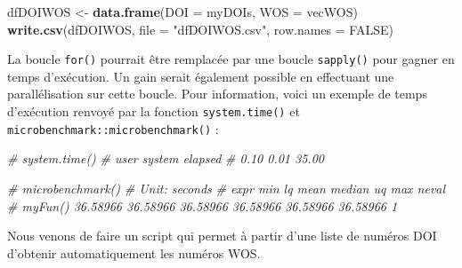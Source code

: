 \documentclass[
]{book}
\newenvironment{Shaded}{\begin{snugshade}}{\end{snugshade}}
\newcommand{\CommentTok}[1]{\textcolor[rgb]{0.56,0.35,0.01}{\textit{#1}}}
\newcommand{\DataTypeTok}[1]{\textcolor[rgb]{0.13,0.29,0.53}{#1}}
\newcommand{\KeywordTok}[1]{\textcolor[rgb]{0.13,0.29,0.53}{\textbf{#1}}}
\newcommand{\NormalTok}[1]{#1}
\newcommand{\OtherTok}[1]{\textcolor[rgb]{0.56,0.35,0.01}{#1}}
\newcommand{\StringTok}[1]{\textcolor[rgb]{0.31,0.60,0.02}{#1}}
\begin{document}
\begin{Shaded}
\begin{Highlighting}[]
\NormalTok{dfDOIWOS <-}\StringTok{ }\KeywordTok{data.frame}\NormalTok{(}\DataTypeTok{DOI =}\NormalTok{ myDOIs, }\DataTypeTok{WOS =}\NormalTok{ vecWOS)}
\KeywordTok{write.csv}\NormalTok{(dfDOIWOS, }\DataTypeTok{file =} \StringTok{"dfDOIWOS.csv"}\NormalTok{, }\DataTypeTok{row.names =} \OtherTok{FALSE}\NormalTok{)}
\end{Highlighting}
\end{Shaded}

La boucle \texttt{for()} pourrait être remplacée par une boucle \texttt{sapply()} pour gagner en temps d'exécution. Un gain serait également possible en effectuant une parallélisation sur cette boucle. Pour information, voici un exemple de temps d'exécution renvoyé par la fonction \texttt{system.time()} et \texttt{microbenchmark::microbenchmark()} :

\begin{Shaded}
\begin{Highlighting}[]
\CommentTok{# system.time()}
\CommentTok{#   user  system elapsed}
\CommentTok{#   0.10    0.01   35.00}

\CommentTok{# microbenchmark()}
\CommentTok{# Unit: seconds}
\CommentTok{#     expr      min       lq     mean   median       uq      max neval}
\CommentTok{#  myFun() 36.58966 36.58966 36.58966 36.58966 36.58966 36.58966     1}
\end{Highlighting}
\end{Shaded}

Nous venons de faire un script qui permet à partir d'une liste de numéros DOI d'obtenir automatiquement les numéros WOS.
\end{document}
